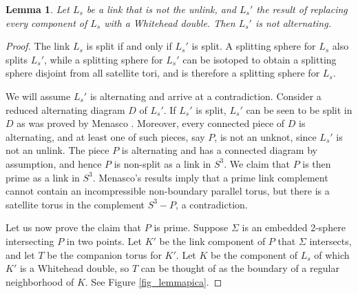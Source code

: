 \documentclass[12pt]{amsart}
\newtheorem{lemma}[thm]{Lemma}
\theoremstyle{definition}
\theoremstyle{remark}
\begin{document}
\begin{lemma}
Let $L_s$ be a link that is not the unlink, and $L_s'$ the result of replacing every component of $L_s$ with a Whitehead double.  Then $L_s'$ is not alternating.
\label{lem_whitehead}
\end{lemma}
\begin{proof}
The link $L_s$ is split if and only if $L_s'$ is split.  A splitting sphere for $L_s$ also splits $L_s'$, while a splitting sphere for $L_s'$ can be isotoped to obtain a splitting sphere disjoint from all satellite tori, and is therefore a splitting sphere for $L_s$.

We will assume $L_s'$ is alternating and arrive at a contradiction. Consider a reduced alternating diagram $D$ of $L_s'$. If $L_s'$ is split, $L_s'$ can be seen to be split in $D$ as was proved by Menasco \cite{Menasco1}. Moreover, every connected piece of $D$ is alternating, and at least one of such pieces, say $P$, is not an unknot, since $L_s'$ is not an unlink. The piece $P$ is alternating and has a connected diagram by assumption, and hence $P$ is non-split as a link in $S^3$. We claim that $P$ is then prime as a link in $S^3$. Menasco's results \cite{Menasco1} imply that a prime link complement cannot contain an incompressible non-boundary parallel torus, but there is a satellite torus in the complement $S^3-P$, a contradiction.



Let us now prove the claim that $P$ is prime.  Suppose $\Sigma$ is an embedded 2-sphere intersecting $P$ in two points.  Let $K'$ be the link component of $P$ that $\Sigma$ intersects, and let $T$ be the companion torus for $K'$. Let $K$ be the component of $L_s$ of which $K'$ is a Whitehead double, so $T$ can be thought of as the boundary of a regular neighborhood of $K$. See Figure \ref{fig_lemmapica}.


\end{proof}
\end{document}
